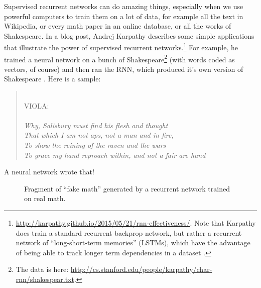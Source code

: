 
Supervised recurrent networks can do amazing things, especially when we use powerful computers to train them on a lot of data, for example all the text in Wikipedia, or every math paper in an online database, or all the works of Shakespeare. In a blog post, Andrej Karpathy describes some  simple applications that illustrate the power of supervised recurrent networks.\footnote{\url{http://karpathy.github.io/2015/05/21/rnn-effectiveness/}. Note that Karpathy does train a standard recurrent backprop network, but rather a recurrent network of ``long-short-term memories'' (LSTMs), which have the advantage of being able to track longer term dependencies in a dataset \cite{karpathy2015unreasonable}.}  For example, he trained a neural network on a bunch of Shakespeare\footnote{The data is here: \url{http://cs.stanford.edu/people/karpathy/char-rnn/shakespear.txt}.}  (with words coded as vectors, of course) and then ran  the RNN, which produced it's own version of Shakespeare \cite{karpathy2015unreasonable}. Here is a sample:

\begin{quotation}
\hspace{5em} \\
VIOLA: \\ \\
\emph{Why, Salisbury must find his flesh and thought \\
That which I am not aps, not a man and in fire, \\
To show the reining of the raven and the wars \\
To grace my hand reproach within, and not a fair are hand}
\end{quotation}
A neural network wrote that! 

\begin{figure}[h]
\centering
{}
\caption[From Karpathy, 2015 \cite{karpathy2015unreasonable}.]{Fragment of ``fake math'' generated by a recurrent network trained on real math.}
\label{fakeMath}
\end{figure}

